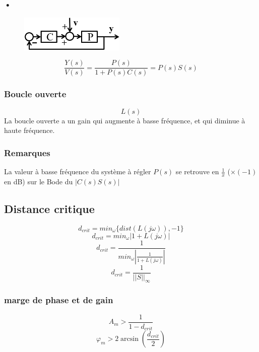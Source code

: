 \documentclass[resume]{subfiles}
\begin{document}
\subsubsection{•}
\begin{figure}[H]
\centering
\includegraphics[width=5.00cm]{img_11.png}
\end{figure}
$$\frac{Y(s)}{V(s)}=\frac{P(s)}{1+P(s)C(s)}=P(s)S(s)$$
\subsubsection{Boucle ouverte}
$$L(s)$$
La boucle ouverte a un gain qui augmente à basse fréquence, et qui diminue à haute fréquence.
\subsubsection{Remarques}
La valeur à basse fréquence du système à régler $P(s)$ se retrouve en $\frac{1}{x}$ ($\times (-1)$ en dB) sur le Bode du $|C(s)S(s)|$

\subsection{Distance critique}

$$d_{crit} = min_{\omega}\{dist(L(j\omega)), -1\}$$
$$d_{crit} = min_{\omega}|1+L(j\omega)|$$
$$d_{crit} = \frac{1}{min_{\omega}|\frac{1}{1+L(j\omega)}|}$$
$$d_{crit} = \frac{1}{||S||_\infty}$$

\subsubsection{marge de phase et de gain}
$$A_m > \frac{1}{1-d_{crit}}$$
$$\varphi_m > 2\arcsin(\frac{d_{crit}}{2})$$
\end{document}
